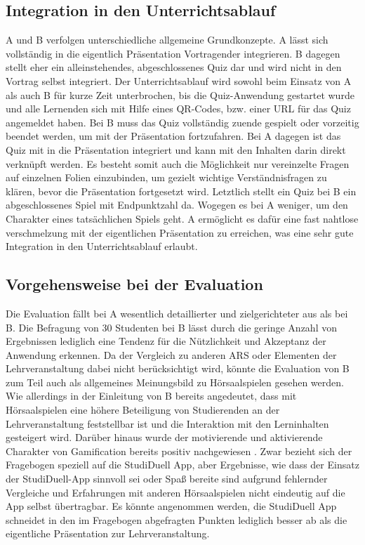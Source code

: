 \documentclass[conference]{IEEEtran}
\begin{document}
\subsection{Integration in den Unterrichtsablauf}
A und B verfolgen unterschiedliche allgemeine Grundkonzepte. A lässt sich vollständig in die eigentlich Präsentation Vortragender integrieren. B dagegen stellt eher ein alleinstehendes, abgeschlossenes Quiz dar und wird nicht in den Vortrag selbst integriert. Der Unterrichtsablauf wird sowohl beim Einsatz von A als auch B für kurze Zeit unterbrochen, bis die Quiz-Anwendung gestartet wurde und alle Lernenden sich mit Hilfe eines QR-Codes, bzw. einer URL für das Quiz angemeldet haben. Bei B muss das Quiz vollständig zuende gespielt oder vorzeitig beendet werden, um mit der Präsentation fortzufahren. Bei A dagegen ist das Quiz mit in die Präsentation integriert und kann mit den Inhalten darin direkt verknüpft werden. Es besteht somit auch die Möglichkeit nur vereinzelte Fragen auf einzelnen Folien einzubinden, um gezielt wichtige Verständnisfragen zu klären, bevor die Präsentation fortgesetzt wird. Letztlich stellt ein Quiz bei B ein abgeschlossenes Spiel mit Endpunktzahl da. Wogegen es bei A weniger, um den Charakter eines tatsächlichen Spiels geht. A ermöglicht es dafür eine fast nahtlose verschmelzung mit der eigentlichen Präsentation zu erreichen, was eine sehr gute Integration in den Unterrichtsablauf erlaubt.

\subsection{Vorgehensweise bei der Evaluation}
Die Evaluation fällt bei A wesentlich detaillierter und zielgerichteter aus als bei B. Die Befragung von 30 Studenten bei B lässt durch die geringe Anzahl von Ergebnissen lediglich eine Tendenz für die Nützlichkeit und Akzeptanz der Anwendung erkennen. Da der Vergleich zu anderen ARS oder Elementen der Lehrveranstaltung dabei nicht berücksichtigt wird, könnte die Evaluation von B zum Teil auch als allgemeines Meinungsbild zu Hörsaalspielen gesehen werden. Wie allerdings in der Einleitung von B bereits angedeutet, dass mit Hörsaalspielen eine höhere Beteiligung von Studierenden an der Lehrveranstaltung feststellbar ist und die Interaktion mit den Lerninhalten gesteigert wird. Darüber hinaus wurde der motivierende und aktivierende Charakter von Gamification bereits positiv nachgewiesen \cite[p. 339f]{Hobert2017}. Zwar bezieht sich der Fragebogen speziell auf die StudiDuell App, aber Ergebnisse, wie dass der Einsatz der StudiDuell-App sinnvoll sei oder Spaß bereite sind aufgrund fehlernder Vergleiche und Erfahrungen mit anderen Hörsaalspielen nicht eindeutig auf die App selbst übertragbar. Es könnte angenommen werden, die StudiDuell App schneidet in den im Fragebogen abgefragten Punkten lediglich besser ab als die eigentliche Präsentation zur Lehrveranstaltung.
\end{document}
